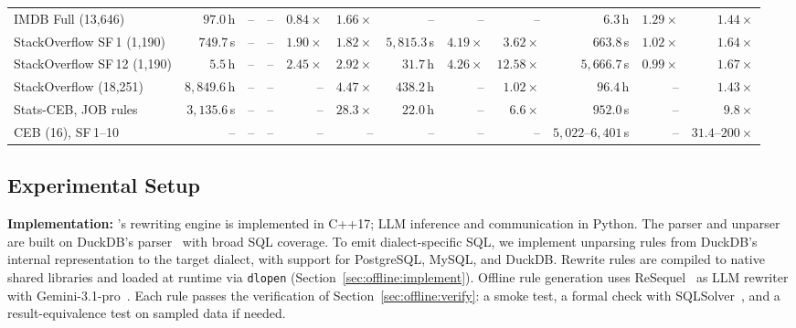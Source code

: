 \begin{table}[!t]
{\begin{tabular}{l|rrrrr|rrr|rrr}
\textsf{IMDB Full} (13,646) & $97.0$\,h & -- & -- & \underline{$0.84\times$} & $\mathbf{1.66}\times$ & -- & -- & -- & $6.3$\,h & \underline{$1.29\times$} & $\mathbf{1.44}\times$ \\
\textsf{StackOverflow} SF\,1 (1,190) & $749.7$\,s & -- & -- & $\mathbf{1.90}\times$ & \underline{$1.82\times$} & $5{,}815.3$\,s & $\mathbf{4.19}\times$ & \underline{$3.62\times$} & $663.8$\,s & \underline{$1.02\times$} & $\mathbf{1.64}\times$ \\
\textsf{StackOverflow} SF\,12 (1,190) & $5.5$\,h & -- & -- & \underline{$2.45\times$} & $\mathbf{2.92}\times$ & $31.7$\,h & \underline{$4.26\times$} & $\mathbf{12.58}\times$ & $5{,}666.7$\,s & \underline{$0.99\times$} & $\mathbf{1.67}\times$ \\
\textsf{StackOverflow} (18,251) & $8{,}849.6$\,h & -- & -- & -- & $4.47\times$ & $438.2$\,h & -- & $1.02\times$ & $96.4$\,h & -- & $1.43\times$ \\
\midrule
\textsf{Stats-CEB}, \textsf{JOB} rules & $3{,}135.6$\,s & -- & -- & -- & $28.3\times$ & $22.0$\,h & -- & $6.6\times$ & $952.0$\,s & -- & $9.8\times$ \\
\textsf{CEB} (16), SF\,1--10 & -- & -- & -- & -- & -- & -- & -- & -- & $5{,}022$--$6{,}401$\,s & -- & $31.4$--$200\times$ \\
\bottomrule
\end{tabular}
}
\vspace{-0.15cm}
\end{table}

\subsection{Experimental Setup}
\label{sec:exp:setup}

\textbf{Implementation:} {\sys}'s rewriting engine is implemented in C++17; LLM inference and communication in Python. The parser and unparser are built on DuckDB's parser~\cite{DuckDB} with broad SQL coverage. To emit dialect-specific SQL, we implement unparsing rules from DuckDB's internal representation to the target dialect, with support for PostgreSQL, MySQL, and DuckDB. Rewrite rules are compiled to native shared libraries and loaded at runtime via \texttt{dlopen} (Section~\ref{sec:offline:implement}). Offline rule generation uses ReSequel~\cite{resequel} as LLM rewriter with Gemini-3.1-pro~\cite{gemini}.
Each rule passes the verification of Section~\ref{sec:offline:verify}: a smoke test, a formal check with SQLSolver~\cite{SQLSolver}, and a result-equivalence test on sampled data if needed.


